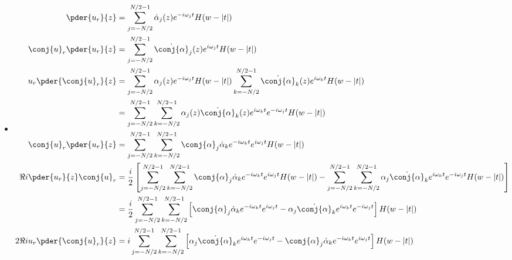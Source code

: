 \begin{itemize}
\begin{equation}
\begin{split}
                        &= \left[2A^2 (\pder{\Phi}{z} \Sigma_{t}^2)\right] (ff'') + \left[ 2A^2 (\pder{\Phi}{z} \ppder{\Sigma}{t}) - 4 A\dot{A} (\pder{\Sigma}{t} \pder{\Phi}{t})  - 2 A^2 (\ppder{\Phi}{t} \Sigma_{z})\right](ff')  \\
                        &\quad -  \left[2A\dot{A} ( \ppder{\Phi}{t}) + 2A^2  (\pder{\Phi}{z} \pder{\Phi}{t}^2)\right](f^2) - \left[4 A^2 (\pder{\Sigma}{z} \pder{\Sigma}{t} \pder{\Phi}{t})\right](f'^2)     \\
       \end{split}
 \end{equation}
 \item 
 \begin{equation}
 \begin{split}
        \pder{u_r}{z} &= \sum_{j=-N/2}^{N/2 - 1} \dot{\alpha}_j(z) e^{-i \omega_j t} H(w-|t|)\\
        \conj{u}_r\pder{u_r}{z} &= \sum_{j=-N/2}^{N/2 - 1} \dot{\conj{\alpha}}_j(z) e^{i \omega_j t} H(w-|t|)\\
        u_r\pder{\conj{u}_r}{z} &= \sum_{j=-N/2}^{N/2 - 1} \alpha_j(z) e^{-i \omega_j t} H(w-|t|) \sum_{k=-N/2}^{N/2 - 1} \dot{\conj{\alpha}}_k(z) e^{i \omega_k t} H(w-|t|)\\
                    &= \sum_{j=-N/2}^{N/2 - 1}\sum_{k=-N/2}^{N/2 - 1} \alpha_j(z) \dot{\conj{\alpha}}_k(z) e^{i \omega_k t} e^{-i \omega_j t} H(w-|t|) \\
        \conj{u}_r\pder{u_r}{z} &= \sum_{j=-N/2}^{N/2 - 1}\sum_{k=-N/2}^{N/2 - 1} \conj{\alpha}_j \dot{\alpha}_k e^{-i \omega_k t} e^{i \omega_j t} H(w-|t|) \\
        \Re{i\pder{u_r}{z}\conj{u}_r} &= \frac{i}{2}\left[\sum_{j=-N/2}^{N/2 - 1}\sum_{k=-N/2}^{N/2 - 1} \conj{\alpha}_j \dot{\alpha}_k e^{-i \omega_k t} e^{i \omega_j t} H(w-|t|)-\sum_{j=-N/2}^{N/2 - 1}\sum_{k=-N/2}^{N/2 - 1} \alpha_j \dot{\conj{\alpha}}_k e^{i \omega_k t} e^{-i \omega_j t} H(w-|t|)\right] \\
          &= \frac{i}{2}\sum_{j=-N/2}^{N/2 - 1}\sum_{k=-N/2}^{N/2 - 1} \left[\conj{\alpha}_j \dot{\alpha}_k e^{-i \omega_k t} e^{i \omega_j t} - \alpha_j \dot{\conj{\alpha}}_k e^{i \omega_k t} e^{-i \omega_j t}\right] H(w-|t|) \\
        2\Re{iu_r\pder{\conj{u}_r}{z}} &= i\sum_{j=-N/2}^{N/2 - 1}\sum_{k=-N/2}^{N/2 - 1} \left[\alpha_j \dot{\conj{\alpha}}_k e^{i \omega_k t} e^{-i \omega_j t} - \conj{\alpha}_j \dot{\alpha}_k e^{-i \omega_k t} e^{i \omega_j t}\right] H(w-|t|) \\

\end{split}
\end{equation}
\end{itemize}
